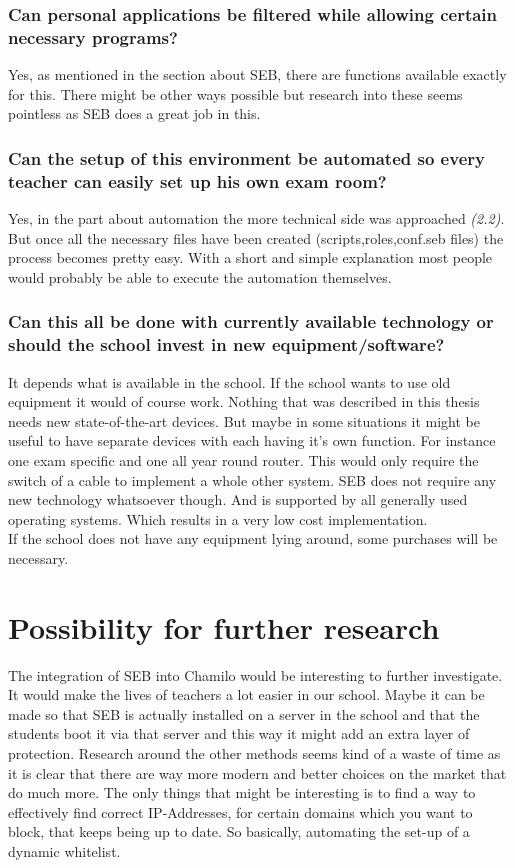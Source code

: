 \subsubsection{Can personal applications be filtered while allowing certain necessary programs?}
Yes, as mentioned in the section about SEB, there are functions available exactly for this. There might be other ways possible but research into these seems pointless as SEB does a great job in this.
\subsubsection{Can the setup of this environment be automated so every teacher can easily set up his own exam room?}
Yes, in the part about automation the more technical side was approached \textit{(2.2)}. But once all the necessary files have been created (scripts,roles,conf.seb files) the process becomes pretty easy. With a short and simple explanation most people would probably be able to execute the automation themselves.
\subsubsection{Can this all be done with currently available technology or should the school invest in new equipment/software?}
It depends what is available in the school. If the school wants to use old equipment it would of course work. Nothing that was described in this thesis needs new state-of-the-art devices. But maybe in some situations it might be useful to have separate devices with each having it's own function. For instance one exam specific and one all year round router. This would only require the switch of a cable to implement a whole other system. SEB does not require any new technology whatsoever though. And is supported by all generally used operating systems. Which results in a very low cost implementation.\\
If the school does not have any equipment lying around, some purchases will be necessary.
\section{Possibility for further research}
The integration of SEB into Chamilo would be interesting to further investigate. It would make the lives of teachers a lot easier in our school. Maybe it can be made so that SEB is actually installed on a server in the school and that the students boot it via that server and this way it might add an extra layer of protection. Research around the other methods seems kind of a waste of time as it is clear that there are way more modern and better choices on the market that do much more. The only things that might be interesting is to find a way to effectively find correct IP-Addresses, for certain domains which you want to block, that keeps being up to date. So basically, automating the set-up of a dynamic whitelist. 
